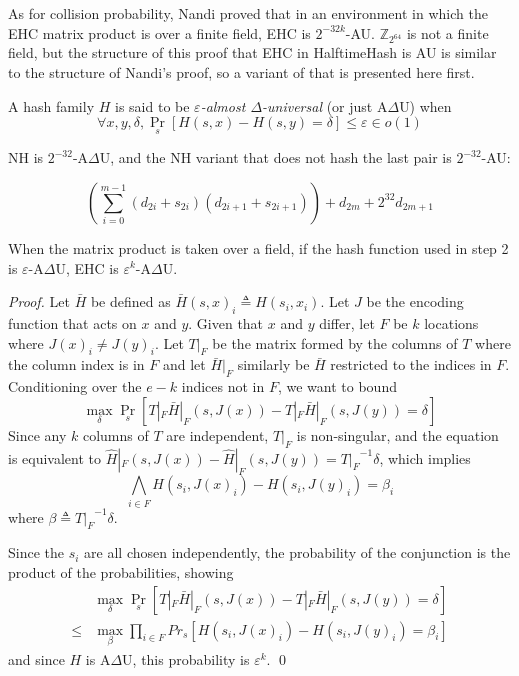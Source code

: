 \documentclass[runningheads]{llncs}
\newcommand{\ints}{\mathbb{Z}}
\begin{document}



As for collision probability, Nandi proved that in an environment in which the EHC matrix product is over a finite field, EHC is $2^{-32k}$-AU.
$\ints_{2^{64}}$ is not a finite field, but the structure of this proof that EHC in HalftimeHash is AU is similar to the structure of Nandi's proof, so a variant of that is presented here first.  \cite{ehc-nandi}

\begin{definition}
  A hash family $H$ is said to be {\em $\varepsilon$-almost $\Delta$-universal} (or just A$\Delta$U) when
  \[
  \forall x,y,\delta, \Pr_s[H(s,x) - H(s,y) = \delta] \leq \varepsilon \in o(1)
  \]
\end{definition}

NH is $2^{-32}$-A$\Delta$U, and the NH variant that does not hash the last pair is $2^{-32}$-AU: \cite{badger}

\[
\left(\sum_{i=0}^{m-1} (d_{2i} + s_{2i})(d_{2i+1} + s_{2i+1})\right) + d_{2m} + 2^{32} d_{2m+1}
\]


\begin{lemma}
  When the matrix product is taken over a field, if the hash function used in step 2 is $\varepsilon$-A$\Delta$U, EHC is $\varepsilon^k$-A$\Delta$U.
\end{lemma}
\begin{proof}
  Let $\bar{H}$ be defined as $\bar{H}(s, x)_i \triangleq H(s_i, x_i)$.
  Let $J$ be the encoding function that acts on $x$ and $y$.
  Given that $x$ and $y$ differ, let $F$ be $k$ locations where $J(x)_i \neq J(y)_i$.
  Let $T|_F$ be the matrix formed by the columns of $T$ where the column index is in $F$ and let $\bar{H}|_F$ similarly be $\bar{H}$ restricted to the indices in $F$.
  Conditioning over the $e -k$ indices not in $F$, we want to bound
  \begin{equation}
    \label{ehc-delta}
    \max_\delta \Pr_s[T|_F \bar{H}|_F(s, J(x)) - T|_F \bar{H}|_F(s, J(y)) = \delta]
  \end{equation}
  Since any $k$ columns of $T$ are independent, $T|_F$ is non-singular, and the equation is equivalent to $\hat{H}|_F(s, J(x)) - \hat{H}|_F(s, J(y)) = {T|_F}^{-1} \delta$, which implies
  \[
  \bigwedge_{i \in F} H(s_i, J(x)_i) - H(s_i, J(y)_i) = \beta_i
  \]
  where $\beta \triangleq {T|_F}^{-1} \delta$.

  Since the $s_i$ are all chosen independently, the probability of the conjunction is the product of the probabilities, showing
  \[
  \begin{array}{rl}
    & \max_\delta \Pr_s[T|_F \bar{H}|_F (s,J(x)) - T|_F \bar{H}|_F(s,J(y)) = \delta] \\
  \leq & \max_\beta \prod_{i \in F} Pr_s[H(s_i, J(x)_i) - H(s_i, J(y)_i) = \beta_i]
  \end{array}
  \]
  and since $H$ is A$\Delta$U, this probability is $\varepsilon^k$.  \qed
\end{proof}
\end{document}
